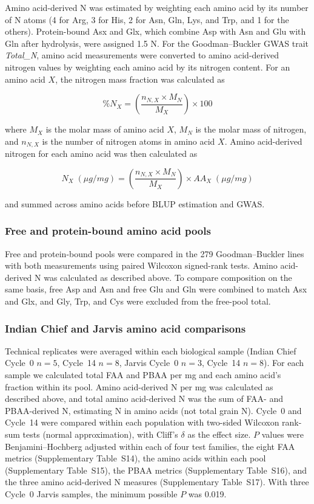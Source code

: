 Amino acid-derived N was estimated by weighting each amino acid by its number of N atoms (4 for Arg, 3 for His, 2 for Asn, Gln, Lys, and Trp, and 1 for the others). Protein-bound Asx and Glx, which combine Asp with Asn and Glu with Gln after hydrolysis, were assigned 1.5 N. For the Goodman--Buckler GWAS trait \textit{Total\_N}, amino acid measurements were converted to amino acid-derived nitrogen values by weighting each amino acid by its nitrogen content. For an amino acid $X$, the nitrogen mass fraction was calculated as

\[
\%N_X =
\left(
\frac{n_{N,X}\times M_N}{M_X}
\right)\times 100
\]

where $M_X$ is the molar mass of amino acid $X$, $M_N$ is the molar mass of nitrogen, and $n_{N,X}$ is the number of nitrogen atoms in amino acid $X$. Amino acid-derived nitrogen for each amino acid was then calculated as

\[
N_X\;(\mu g/mg) =
\left(
\frac{n_{N,X}\times M_N}{M_X}
\right)
\times AA_X\;(\mu g/mg)
\]

and summed across amino acids before BLUP estimation and GWAS.

\subsubsection{Free and protein-bound amino acid pools}
Free and protein-bound pools were compared in the 279 Goodman--Buckler lines with both measurements \citep{Shrestha2022} using paired Wilcoxon signed-rank tests. Amino acid-derived N was calculated as described above. To compare composition on the same basis, free Asp and Asn and free Glu and Gln were combined to match Asx and Glx, and Gly, Trp, and Cys were excluded from the free-pool total.

\subsubsection{Indian Chief and Jarvis amino acid comparisons}
Technical replicates were averaged within each biological sample (Indian Chief Cycle~0 $n = 5$, Cycle~14 $n = 8$, Jarvis Cycle~0 $n = 3$, Cycle~14 $n = 8$). For each sample we calculated total FAA and PBAA per mg and each amino acid’s fraction within its pool. Amino acid-derived N per mg was calculated as described above, and total amino acid-derived N was the sum of FAA- and PBAA-derived N, estimating N in amino acids (not total grain N). Cycle~0 and Cycle~14 were compared within each population with two-sided Wilcoxon rank-sum tests (normal approximation), with Cliff’s $\delta$ as the effect size. $P$ values were Benjamini--Hochberg adjusted within each of four test families, the eight FAA metrics (Supplementary Table~S14), the amino acids within each pool (Supplementary Table~S15), the PBAA metrics (Supplementary Table~S16), and the three amino acid-derived N measures (Supplementary Table~S17). With three Cycle~0 Jarvis samples, the minimum possible $P$ was 0.019.

